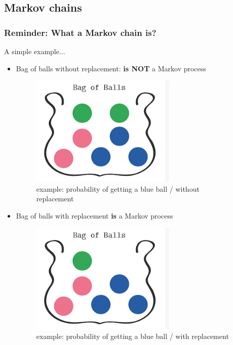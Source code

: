 \documentclass[xcolor=dvipsnames, compress]{beamer}
\begin{document}
\begin{frame}
\section{Markov chains}
\frametitle{Reminder: What a Markov chain is?}
A simple example...
\begin{itemize}
\item Bag of balls without replacement: \textbf{is NOT} a Markov process
\begin{figure}
	\includegraphics[scale=0.25]{images/ex1_bag_of_balls.png}
	\caption{example: probability of getting a blue ball / without replacement}
\end{figure}
\item Bag of balls with replacement \textbf{is} a Markov process
\begin{figure}
	\includegraphics[scale=0.25]{images/ex1_bag_of_balls_wrep.png}
	\caption{example: probability of getting a blue ball / with replacement}
\end{figure}
\end{itemize}
\end{frame}
%
\end{document}
